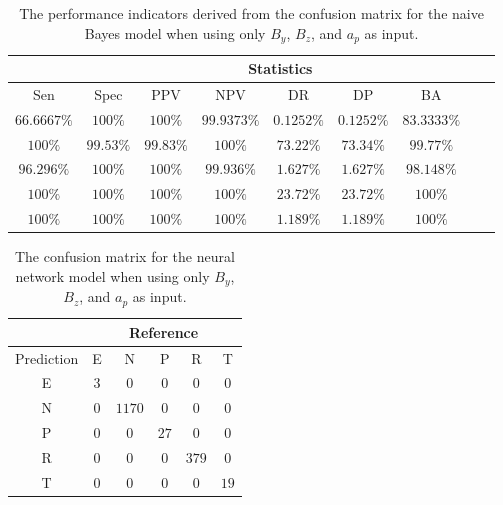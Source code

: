 \begin{table}[!ht]
	\centering
	\begin{tabular}{|c|c|c|c|c|c|c|c|c|}
		\hline
		 & \multicolumn{7}{c|}{Statistics} \\ \hline
		Sen & Spec & PPV & NPV & DR & DP & BA \\ \hline
		$66.6667\%$ & $100\%$ & $100\%$ & $99.9373\%$ & $0.1252\%$ & $0.1252\%$ & $83.3333\%$ \\ \hline
		$100\%$ & $99.53\%$ & $99.83\%$ & $100\%$ & $73.22\%$ & $73.34\%$ & $99.77\%$ \\ \hline
		$96.296\%$ & $100\%$ & $100\%$ & $99.936\%$ & $1.627\%$ & $1.627\%$ & $98.148\%$ \\ \hline
		$100\%$ & $100\%$ & $100\%$ & $100\%$ & $23.72\%$ & $23.72\%$ & $100\%$ \\ \hline
		$100\%$ & $100\%$ & $100\%$ & $100\%$ & $1.189\%$ & $1.189\%$ & $100\%$ \\ \hline
	\end{tabular}
	\caption{The performance indicators derived from the confusion matrix for the naive Bayes model when using only $B_{y}$, $B_{z}$, and $a_{p}$ as input.}
	\label{tab:cs:yzap:nb}
\end{table}

\begin{table}[!ht]
	\centering
	\begin{tabular}{|c|c|c|c|c|c|}
		\hline
		 & \multicolumn{5}{|c|}{Reference} \\ \hline
		 Prediction & E & N & P & R & T \\ \hline
		 E & $3$ & $0$ & $0$ & $0$ & $0$ \\ \hline
		 N & $0$ & $1170$ & $0$ & $0$ & $0$ \\ \hline
		 P & $0$ & $0$ & $27$ & $0$ & $0$ \\ \hline
		 R & $0$ & $0$ & $0$ & $379$ & $0$ \\ \hline
		 T & $0$ & $0$ & $0$ & $0$ & $19$ \\ \hline
	\end{tabular}
	\caption{The confusion matrix for the neural network model when using only $B_{y}$, $B_{z}$, and $a_{p}$ as input.}
	\label{tab:cm:yzap:nnet}
\end{table}

